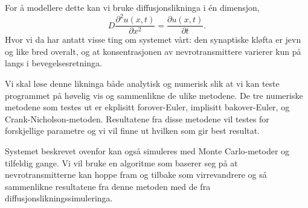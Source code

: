 \documentclass[norsk, 10pt]{article}
\begin{document}
For å modellere dette kan vi bruke diffusjonslikninga i én dimensjon,
$$ D\frac{\partial^2u(x,t)}{\partial x^2} = \frac{\partial u(x,t)}{\partial t}. $$
Hvor vi da har antatt visse ting om systemet vårt: den synaptiske kløfta er jevn og like bred overalt, og at konsentrasjonen av nevrotransmittere varierer kun på langs i bevegelsesretninga.

Vi skal løse denne likninga både analytisk og numerisk slik at vi kan teste programmet på høvelig vis og sammenlikne de ulike metodene. De tre numeriske metodene som testes ut er ekplisitt forover-Euler, implisitt bakover-Euler, og Crank-Nicholson-metoden. Resultatene fra disse metodene vil testes for forskjellige parametre og vi vil finne ut hvilken som gir best resultat.

Systemet beskrevet ovenfor kan også simuleres med Monte Carlo-metoder og tilfeldig gange. Vi vil bruke en algoritme som baserer seg på at nevrotransmitterne kan hoppe fram og tilbake som virrevandrere og så sammenlikne resultatene fra denne metoden med de fra diffusjonslikningssimuleringa.
\end{document}
